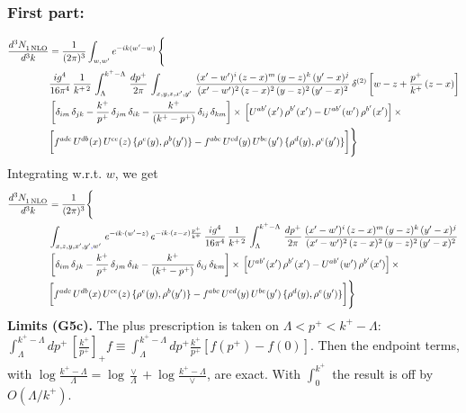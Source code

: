 \documentclass[9pt]{article}
\numberwithin{equation}{section}
\begin{document}
\subsubsection{First part:}
\begin{align}
    \frac{d^{3}N_{1\,\rm NLO}^{\rm}}{d^{3}k}  & = \frac{1}{(2\pi)^{3}}  \int_{w, w^\prime} e^{-ik(w^\prime-w)}\, \Bigg\{\notag \\ & \frac{ig^{4}}{16\pi^{4}}\, \frac{1}{k^{+\,2}}\,\int_{\Lambda}^{k^{+}-\Lambda}\, \frac{dp^{+}}{2\pi}\,\int_{x,y,z,x',y'}\,\frac{(x'-w')^{i}\,(z-x)^{m}\,(y-z)^{k}\,(y'-x)^{j}}{(x'-w')^{2}\,(z-x)^{2}\,(y-z)^{2}\,(y'-x)^{2}}\, \delta^{(2)}\left[w-z+\frac{p^{+}}{k^{+}}\,(z-x)\right]\notag \\ & \left[\delta_{im}\,\delta_{jk}-\frac{k^{+}}{p^{+}}\, \delta_{jm}\,\delta_{ik}-\frac{k^{+}}{(k^{+}-p^{+})}\, \delta_{ij}\,\delta_{km}\right]\times\, \left[U^{ab'}(x')\,\rho^{b'}(x')-U^{ab'}(w')\,\rho^{b'}(x')\right]\times\notag \\ & \bigg[f^{adc}\,U^{db}(x)\,U^{ce}(z)\, \{\rho^{e}(y),\rho^{b}(y')\}-f^{abc}\,U^{cd}(y)\,U^{be}(y')\, \{\rho^{d}(y),\rho^{e}(y')\}\bigg]\Bigg\}
\end{align}
Integrating w.r.t. $w$, we get
\begin{align}
     \frac{d^{3}N_{1\,\rm NLO}^{\rm}}{d^{3}k}  & = \frac{1}{(2\pi)^{3}} \Bigg\{\notag \\ &  \int_{x,z,y,x',y'{\color{blue},}w'}\,e^{-ik\cdot (w^\prime-z)}\,e^{-ik\cdot (z-x)\frac{p^{+}}{k^{+}}}\,\frac{ig^{4}}{16\pi^{4}}\, \frac{1}{k^{+\,2}}\,\int_{\Lambda}^{k^{+}-\Lambda}\, \frac{dp^{+}}{2\pi}\,\frac{(x'-w')^{i}\,(z-x)^{m}\,(y-z)^{k}\,(y'-x)^{j}}{(x'-w')^{2}\,(z-x)^{2}\,(y-z)^{2}\,(y'-x)^{2}}\,\notag \\ & \left[\delta_{im}\,\delta_{jk}-\frac{k^{+}}{p^{+}}\, \delta_{jm}\,\delta_{ik}-\frac{k^{+}}{(k^{+}-p^{+})}\, \delta_{ij}\,\delta_{km}\right]\times\, \left[U^{ab'}(x')\,\rho^{b'}(x')-U^{ab'}(w')\,\rho^{b'}(x')\right]\times\notag \\ & \bigg[f^{adc}\,U^{db}(x)\,U^{ce}(z)\, \{\rho^{e}(y),\rho^{b}(y')\}-f^{abc}\,U^{cd}(y)\,U^{be}(y')\, \{\rho^{d}(y),\rho^{e}(y')\}\bigg]\Bigg\}
\end{align}
\begingroup\color{blue}\noindent\textbf{Limits (G5c).} The plus prescription is taken on $\Lambda<p^{+}<k^{+}-\Lambda$: $\int_{\Lambda}^{k^{+}-\Lambda}dp^{+}\,[\frac{k^{+}}{p^{+}}]_{+}f\equiv\int_{\Lambda}^{k^{+}-\Lambda}dp^{+}\frac{k^{+}}{p^{+}}[f(p^{+})-f(0)]$. Then the endpoint terms, with $\log\frac{k^{+}-\Lambda}{\Lambda}=\log\frac{\vee}{\Lambda}+\log\frac{k^{+}-\Lambda}{\vee}$, are exact. With $\int_{0}^{k^{+}}$ the result is off by $O(\Lambda/k^{+})$.\par\endgroup
\end{document}
